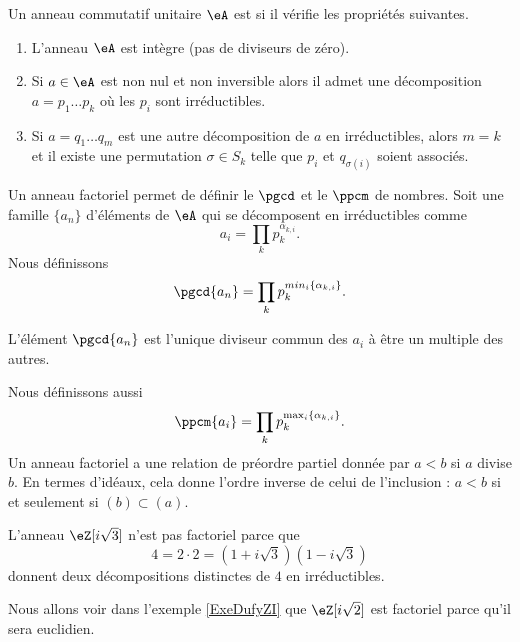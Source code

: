 \begin{definition}
    Un anneau commutatif unitaire \( \eA\) est  si il vérifie les propriétés suivantes.
    \begin{enumerate}
        \item
            L'anneau \( \eA\) est intègre (pas de diviseurs de zéro).
        \item
            Si \( a\in \eA\) est non nul et non inversible alors il admet une décomposition \( a=p_1\ldots p_k\) où les \( p_i\) sont irréductibles.
        \item
            Si \( a=q_1\ldots q_m\) est une autre décomposition de \( a\) en irréductibles, alors \( m=k\) et il existe une permutation \( \sigma\in S_k\) telle que \( p_i\) et \( q_{\sigma(i)}\) soient associés.
    \end{enumerate}
\end{definition}

Un anneau factoriel permet de définir le \( \pgcd\) et le \( \ppcm\) de nombres. Soit une famille \( \{ a_n \}\) d'éléments de \( \eA\) qui se décomposent en irréductibles comme
\begin{equation}
    a_i=\prod_{k}p_k^{\alpha_{k,i}}.
\end{equation}
Nous définissons
\begin{equation}
    \pgcd\{ a_n \}=\prod_kp_k^{min_i\{ \alpha_{k,i} \}}.
\end{equation}
\begin{proposition}
    L'élément \( \pgcd\{ a_n \}\) est l'unique diviseur commun des \( a_i\) à être un multiple des autres.
\end{proposition}

Nous définissons aussi
\begin{equation}
    \ppcm\{ a_i \}=\prod_kp_k^{\max_i\{ \alpha_{k,i} \}}.
\end{equation}
Un anneau factoriel a une relation de préordre partiel donnée par \( a<b\) si \( a\) divise \( b\). En termes d'idéaux, cela donne l'ordre inverse de celui de l'inclusion : \( a<b\) si et seulement si \( (b)\subset (a)\).

\begin{example}
    L'anneau \( \eZ[i\sqrt{3}]\) n'est pas factoriel parce que
    \begin{equation}
        4=2\cdot 2=(1+i\sqrt{3})(1-i\sqrt{3})
    \end{equation}
    donnent deux décompositions distinctes de \( 4\) en irréductibles.
\end{example}
Nous allons voir dans l'exemple \ref{ExeDufyZI} que \( \eZ[i\sqrt{2}]\) est factoriel parce qu'il sera euclidien.

